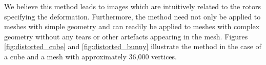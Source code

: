 We believe this method leads to images which are intuitively related to
the rotors specifying the deformation. Furthermore, the method need not
only be applied to meshes with simple geometry and can readily be applied to
meshes with complex geometry without any tears or other artefacts appearing
in the mesh. Figures \ref{fig:distorted_cube} and \ref{fig:distorted_bunny}
illustrate the method in the case of a cube and a mesh with approximately
36,000 vertices.



